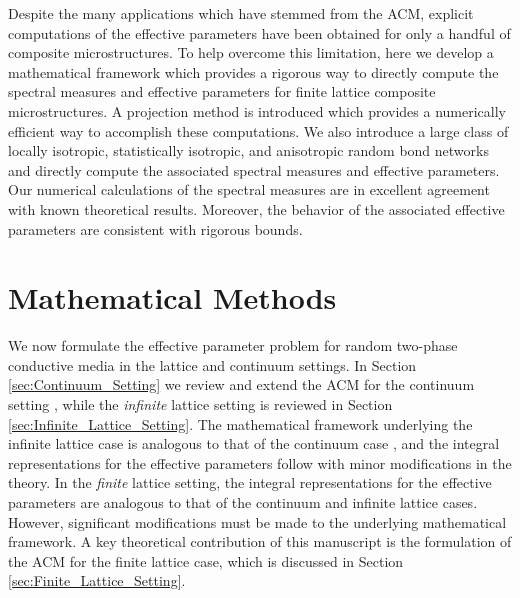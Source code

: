 \documentclass{cmslatex}
\begin{document}
Despite the many applications which have stemmed from the ACM,
explicit computations of the effective parameters have been obtained
for only a handful of composite microstructures. To help overcome
this limitation, here we develop a mathematical framework which
provides a rigorous way to directly compute the spectral measures and
effective parameters for finite lattice composite microstructures. A
projection method is introduced which provides a numerically efficient
way to accomplish these computations. We also introduce a large class
of locally isotropic, statistically isotropic, and anisotropic random
bond networks and directly compute the associated spectral measures
and effective parameters. Our numerical calculations of the spectral
measures are in excellent agreement with known theoretical results.
Moreover, the behavior of the associated effective parameters are
consistent with rigorous bounds.     

\section{Mathematical Methods}\label{sec:Mathematical_Methods} 
%
We now formulate the effective parameter problem for random
two-phase conductive media in the lattice and continuum
settings. In Section \ref{sec:Continuum_Setting} we review and extend
the ACM for the continuum setting \cite{Golden:CMP-473}, while the
\emph{infinite} 
lattice setting \cite{Bruno:JSP-365,Golden:CMP-467} is reviewed in
Section \ref{sec:Infinite_Lattice_Setting}. The mathematical framework
underlying the infinite lattice case is analogous to that of
the continuum case \cite{Bruno:JSP-365}, and the integral
representations for the effective parameters follow with minor
modifications in the theory. In the \emph{finite} lattice setting, the
integral representations for the effective parameters are analogous to
that of the continuum and infinite lattice cases. However,
significant modifications must be made to the underlying mathematical
framework. A key theoretical contribution of this manuscript is the
formulation of the ACM for the finite lattice case, which is discussed
in Section \ref{sec:Finite_Lattice_Setting}.  
\end{document}
